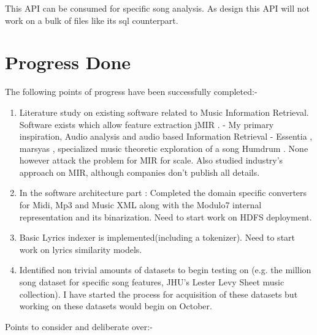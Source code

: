 This API can be consumed for specific song analysis. As design this API will not work on a bulk of files like its sql counterpart. 


\chapter{Progress Done}
The following points of progress have been successfully completed:-
\begin{enumerate}
\item Literature study on existing software related to Music Information Retrieval. Software exists which allow feature extraction {jMIR \cite{jMIR2010}.  - My primary inspiration}, Audio analysis and audio based Information Retrieval - {Essentia \cite{essentia}, marsyas \cite{marsyas}}, specialized music theoretic exploration of a song {Humdrum \cite{humdrum}}. None however attack the problem for MIR for scale. Also studied industry's approach on MIR, although companies don't publish all details. 
\item In the software architecture part : Completed the domain specific converters for Midi, Mp3 and Music XML along with the Modulo7 internal representation and its binarization. Need to start work on HDFS deployment.
\item Basic Lyrics indexer is implemented(including a tokenizer). Need to start work on lyrics similarity models. 
\item Identified non trivial amounts of datasets to begin testing on (e.g. the million song dataset for specific song features, JHU's Lester Levy Sheet music collection). I have started the process for acquisition of these datasets but working on these datasets would begin on October. 
\end{enumerate}
Points to consider and deliberate over:-
